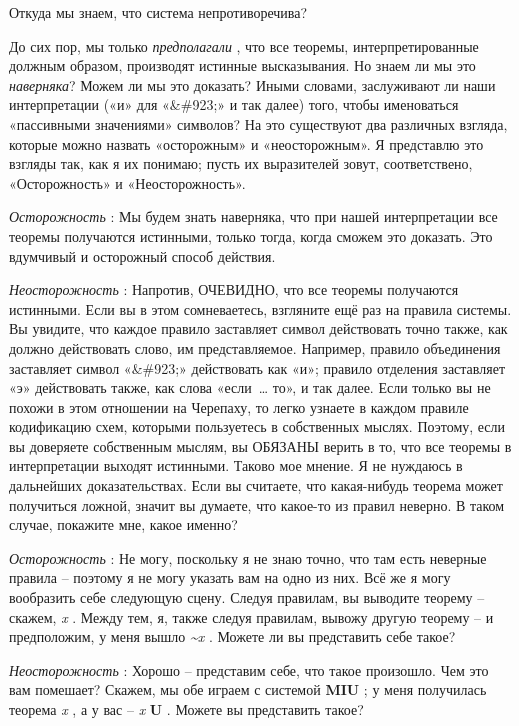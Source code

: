 \documentclass[../main.tex]{subfiles}
\begin{document}
Откуда мы знаем, что система непротиворечива?

До сих пор, мы только \emph{предполагали} , что все теоремы, интерпретированные должным образом, производят истинные высказывания. Но знаем ли мы это \emph{наверняка}? Можем ли мы это доказать? Иными словами, заслуживают ли наши интерпретации («и» для «\&\#923;» и так далее) того, чтобы именоваться «пассивными значениями» символов? На это существуют два различных взгляда, которые можно назвать «осторожным» и «неосторожным». Я представлю это взгляды так, как я их понимаю; пусть их выразителей зовут, соответствено, «Осторожность» и «Неосторожность».

\emph{Осторожность} : Мы будем знать наверняка, что при нашей интерпретации все теоремы получаются истинными, только тогда, когда сможем это доказать. Это вдумчивый и осторожный способ действия.

\emph{Неосторожность} : Напротив, ОЧЕВИДНО, что все теоремы получаются истинными. Если вы в этом сомневаетесь, взгляните ещё раз на правила системы. Вы увидите, что каждое правило заставляет символ действовать точно также, как должно действовать слово, им представляемое. Например, правило объединения заставляет символ «\&\#923;» действовать как «и»; правило отделения заставляет «э» действовать также, как слова «если~\ldots{} то», и так далее. Если только вы не похожи в этом отношении на Черепаху, то легко узнаете в каждом правиле кодификацию схем, которыми пользуетесь в собственных мыслях. Поэтому, если вы доверяете собственным мыслям, вы ОБЯЗАНЫ верить в то, что все теоремы в интерпретации выходят истинными. Таково мое мнение. Я не нуждаюсь в дальнейших доказательствах. Если вы считаете, что какая-нибудь теорема может получиться ложной, значит вы думаете, что какое-то из правил неверно. В таком случае, покажите мне, какое именно?

\emph{Осторожность} : Не могу, поскольку я не знаю точно, что там есть неверные правила \--- поэтому я не могу указать вам на одно из них. Всё же я могу вообразить себе следующую сцену. Следуя правилам, вы выводите теорему \--- скажем, \emph{x} . Между тем, я, также следуя правилам, вывожу другую теорему \--- и предположим, у меня вышло \emph{\textasciitilde x} . Можете ли вы представить себе такое?

\emph{Неосторожность} : Хорошо \--- представим себе, что такое произошло. Чем это вам помешает? Скажем, мы обе играем с системой \textbf{MIU} ; у меня получилась теорема \emph{x} , а у вас \--- \emph{x} \textbf{U} . Можете вы представить такое?
\end{document}
